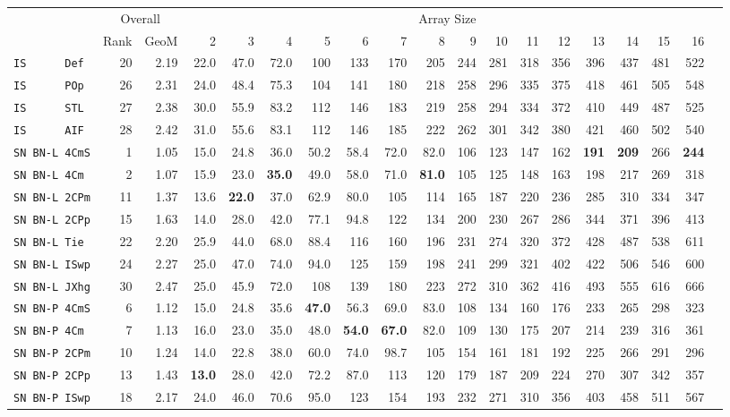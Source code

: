 \begin{tabular}{l | r @{~~} r | r@{~~}r@{~~}r@{~~}r@{~~}r@{~~}r@{~~}r@{~~}r@{~~}r@{~~}r@{~~}r@{~~}r@{~~}r@{~~}r@{~~}r@{~~}r|}
 & \multicolumn{2}{c|}{Overall} & \multicolumn{15}{c}{Array Size} \\
 & Rank & GeoM & 2&3&4&5&6&7&8&9&10&11&12&13&14&15&16\\ \hline
\verb+IS      Def+ & 20 & 2.19 & 22.0&47.0&72.0&100&133&170&205&244&281&318&356&396&437&481&522\\
\verb+IS      POp+ & 26 & 2.31 & 24.0&48.4&75.3&104&141&180&218&258&296&335&375&418&461&505&548\\
\verb+IS      STL+ & 27 & 2.38 & 30.0&55.9&83.2&112&146&183&219&258&294&334&372&410&449&487&525\\
\verb+IS      AIF+ & 28 & 2.42 & 31.0&55.6&83.1&112&146&185&222&262&301&342&380&421&460&502&540\smallskip \\
\verb+SN BN-L 4CmS+ & 1 & 1.05 & 15.0&24.8&36.0&50.2&58.4&72.0&82.0&106&123&147&162&\textbf{191}&\textbf{209}&266&\textbf{244}\\
\verb+SN BN-L 4Cm + & 2 & 1.07 & 15.9&23.0&\textbf{35.0}&49.0&58.0&71.0&\textbf{81.0}&105&125&148&163&198&217&269&318\\
\verb+SN BN-L 2CPm+ & 11 & 1.37 & 13.6&\textbf{22.0}&37.0&62.9&80.0&105&114&165&187&220&236&285&310&334&347\\
\verb+SN BN-L 2CPp+ & 15 & 1.63 & 14.0&28.0&42.0&77.1&94.8&122&134&200&230&267&286&344&371&396&413\\
\verb+SN BN-L Tie + & 22 & 2.20 & 25.9&44.0&68.0&88.4&116&160&196&231&274&320&372&428&487&538&611\\
\verb+SN BN-L ISwp+ & 24 & 2.27 & 25.0&47.0&74.0&94.0&125&159&198&241&299&321&402&422&506&546&600\\
\verb+SN BN-L JXhg+ & 30 & 2.47 & 25.0&45.9&72.0&108&139&180&223&272&310&362&416&493&555&616&666\smallskip \\
\verb+SN BN-P 4CmS+ & 6 & 1.12 & 15.0&24.8&35.6&\textbf{47.0}&56.3&69.0&83.0&108&134&160&176&233&265&298&323\\
\verb+SN BN-P 4Cm + & 7 & 1.13 & 16.0&23.0&35.0&48.0&\textbf{54.0}&\textbf{67.0}&82.0&109&130&175&207&214&239&316&361\\
\verb+SN BN-P 2CPm+ & 10 & 1.24 & 14.0&22.8&38.0&60.0&74.0&98.7&105&154&161&181&192&225&266&291&296\\
\verb+SN BN-P 2CPp+ & 13 & 1.43 & \textbf{13.0}&28.0&42.0&72.2&87.0&113&120&179&187&209&224&270&307&342&357\\
\verb+SN BN-P ISwp+ & 18 & 2.17 & 24.0&46.0&70.6&95.0&123&154&193&232&271&310&356&403&458&511&567\\

\end{tabular}
